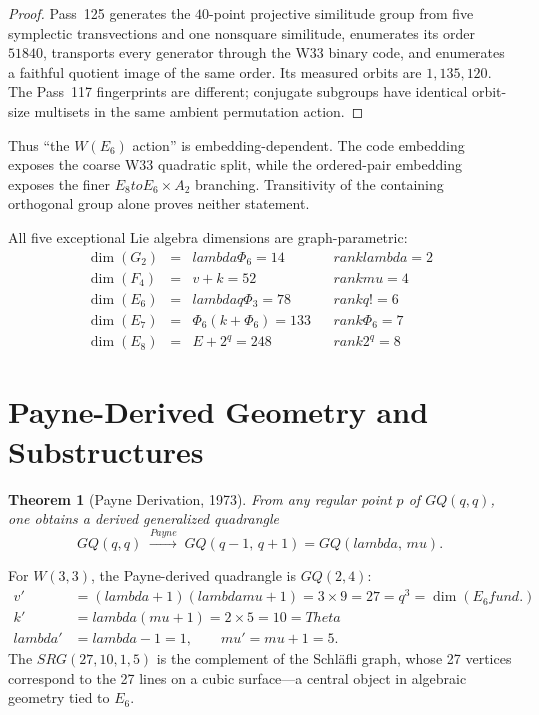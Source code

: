 \documentclass[12pt,a4paper]{article}
\def\mathrm#1{#1}%
\def\textbf#1{#1}%
\def\text#1{#1}%
\def\lambda{lambda}%
\def\mu{mu}%
\def\Phi#1{Phi#1}%
\def\Theta{Theta}%
\def\to{ to }%
\newtheorem{theorem}{Theorem}[section]
\theoremstyle{definition}
\newcommand{\SRG}{\mathrm{SRG}}
\newcommand{\GQ}{\mathrm{GQ}}
\newcommand{\Phithree}{\Phi_3}
\newcommand{\Phisix}{\Phi_6}
\begin{document}
\begin{proof}
Pass~125 generates the $40$-point projective similitude group from five
symplectic transvections and one nonsquare similitude, enumerates its order
$51840$, transports every generator through the W33 binary code, and
enumerates a faithful quotient image of the same order.  Its measured orbits
are $1,135,120$.  The Pass~117 fingerprints are different; conjugate
subgroups have identical orbit-size multisets in the same ambient
permutation action.
\end{proof}

Thus ``the $W(E_6)$ action'' is embedding-dependent.  The code embedding
exposes the coarse W33 quadratic split, while the ordered-pair embedding
exposes the finer $E_8\to E_6\times A_2$ branching.  Transitivity of the
containing orthogonal group alone proves neither statement.

All five exceptional Lie algebra dimensions are graph-parametric:
\begin{equation}
\renewcommand{\arraystretch}{1.3}
\begin{array}{rclcl}
\dim(G_2) &=& \lambda\Phisix = 14 && \text{rank } \lambda = 2 \\
\dim(F_4) &=& v+k = 52 && \text{rank } \mu = 4 \\
\dim(E_6) &=& \lambda q\Phithree = 78 && \text{rank } q! = 6 \\
\dim(E_7) &=& \Phisix(k+\Phisix) = 133 && \text{rank } \Phisix = 7 \\
\dim(E_8) &=& E + 2^q = 248 && \text{rank } 2^q = 8
\end{array}
\label{eq:exceptional}
\end{equation}


\section{Payne-Derived Geometry and Substructures}
\label{sec:payne}

\begin{theorem}[Payne Derivation, 1973]
\label{thm:payne}
From any regular point $p$ of $\GQ(q,q)$, one obtains a derived
generalized quadrangle
\begin{equation}
\GQ(q,q) \;\xrightarrow{\text{Payne}}\; \GQ(q-1,\,q+1) = \GQ(\lambda,\,\mu).
\end{equation}
\end{theorem}

For $W(3,3)$, the Payne-derived quadrangle is $\GQ(2,4)$:
\begin{equation}
\begin{aligned}
v' &= (\lambda+1)(\lambda\mu+1) = 3\times 9 = 27 = q^3 = \dim(E_6\text{ fund.}) \\
k' &= \lambda(\mu+1) = 2\times 5 = 10 = \Theta \\
\lambda' &= \lambda - 1 = 1, \qquad \mu' = \mu+1 = 5.
\end{aligned}
\end{equation}
The $\SRG(27,10,1,5)$ is the complement of the \textbf{Schl\"afli graph},
whose 27 vertices correspond to the \textbf{27 lines on a cubic surface}---a
central object in algebraic geometry tied to $E_6$.
\end{document}

